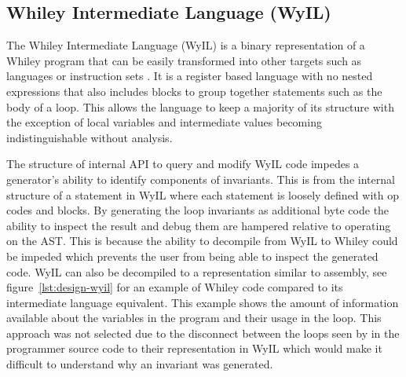 \subsection{Whiley Intermediate Language (WyIL)}

The Whiley Intermediate Language (WyIL) is a binary representation of a Whiley program
that can be easily transformed into other targets such as languages or
instruction sets \cite{wyil}.
It is a register based language with no nested expressions
that also includes blocks to group together statements such as the body of a loop.
This allows the language to keep a majority of its structure with the
exception of local variables and intermediate values becoming indistinguishable
without analysis.

The structure of internal API to query and modify WyIL code impedes a
generator's ability to identify components of invariants.
This is from the internal structure of a statement in WyIL where each
statement is loosely defined with op codes and blocks.
By generating the loop invariants as additional byte code the ability to
inspect the result and debug them are hampered relative to operating on the
AST.  This is because the ability to decompile from WyIL to Whiley could
be impeded which prevents the user from being able to inspect the generated
code.
WyIL can also be decompiled to a representation similar to assembly, see
figure~\ref{lst:design-wyil} for an example of Whiley code compared to its
intermediate language equivalent.
This example shows the amount of information available about the variables
in the program and their usage in the loop.
This approach was not selected due to the disconnect between the loops
seen by in the programmer source code to their representation in WyIL which
would make it difficult to understand why an invariant was generated.


